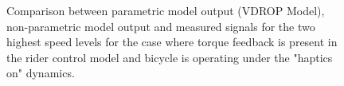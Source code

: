  \begin{figure}
    \centering
    \begin{subfigure}[b]{\textwidth}
        \centering
        \caption{}
        \label{fig:ropm_fit3}
    \end{subfigure}
    \begin{subfigure}[b]{\textwidth}
        \centering
        \caption{}
        \label{fig:ropm_fit4}
    \end{subfigure}
    
    \caption{Comparison between parametric model output (VDROP Model), non-parametric model output and  measured signals for the two highest speed levels for the case where torque feedback is present in the rider control model and bicycle is operating under the "haptics on" dynamics.}
    \label{fig:ropm_fitB}
 \end{figure}


